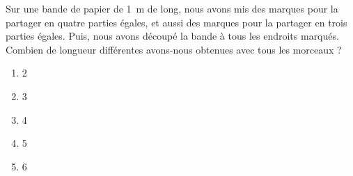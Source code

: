 Sur une bande de papier de 1~m de long, nous avons mis des marques pour la partager en quatre parties égales, et aussi des marques pour la partager en trois parties égales. Puis, nous avons découpé la bande à tous les endroits marqués. Combien de longueur différentes avons-nous obtenues avec tous les morceaux ?
\begin{multicols}{5}
  \begin{enumerate}[A/]
  \item 2
  \item 3
  \item 4
  \item 5
  \item 6
  \end{enumerate}
\end{multicols}